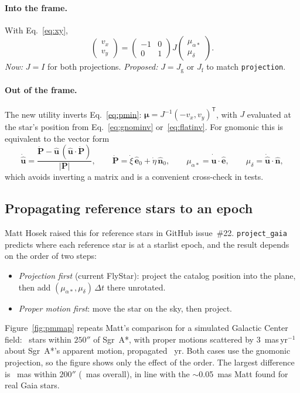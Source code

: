\documentclass[11pt]{article}
\newcommand{\code}[1]{\texttt{#1}}
\newcommand{\uvec}[1]{\hat{\mathbf #1}}
\begin{document}
\paragraph{Into the frame.} With Eq.~\eqref{eq:xy},
\begin{equation}
  \begin{pmatrix} v_x \\ v_y \end{pmatrix}
  = \begin{pmatrix} -1 & 0 \\ 0 & 1 \end{pmatrix} J
    \begin{pmatrix} \mu_{\alpha*} \\ \mu_\delta \end{pmatrix}.
  \label{eq:pmin}
\end{equation}
\emph{Now:} $J = I$ for both projections. \emph{Proposed:} $J = J_\mathrm{g}$
or $J_\mathrm{f}$ to match \code{projection}.

\paragraph{Out of the frame.} The new utility inverts Eq.~\eqref{eq:pmin}:
$\boldsymbol\mu = J^{-1}(-v_x, v_y)^{\mathsf T}$, with $J$ evaluated at the
star's position from Eq.~\eqref{eq:gnominv} or~\eqref{eq:flatinv}. For
gnomonic this is equivalent to the vector form
\begin{equation}
  \dot{\uvec u} = \frac{\dot{\mathbf P} - \uvec u\,(\uvec u\cdot\dot{\mathbf P})}{|\mathbf P|},
  \qquad \dot{\mathbf P} = \dot\xi\,\uvec e_0 + \dot\eta\,\uvec n_0,
  \qquad \mu_{\alpha*} = \dot{\uvec u}\cdot\uvec e, \qquad \mu_\delta = \dot{\uvec u}\cdot\uvec n,
  \label{eq:pmout}
\end{equation}
which avoids inverting a matrix and is a convenient cross-check in tests.

\subsection{Propagating reference stars to an epoch}
\label{sec:order}

Matt Hosek raised this for reference stars in GitHub issue~\#22.
\code{project\_gaia} predicts where each reference star is at a starlist epoch,
and the result depends on the order of two steps:
\begin{itemize}
  \item \emph{Projection first} (current FlyStar): project the catalog position
    into the plane, then add $(\mu_{\alpha*},\mu_\delta)\,\Delta t$ there
    unrotated.
  \item \emph{Proper motion first}: move the star on the sky, then project.
\end{itemize}
Figure~\ref{fig:pmmap} repeats Matt's comparison for a simulated Galactic
Center field: \PMMapN\ stars within $250''$ of Sgr~A*, with proper motions
scattered by 3~mas\,yr$^{-1}$ about Sgr~A*'s apparent motion, propagated
\PMMapDt~yr. Both cases use the gnomonic projection, so the figure shows only
the effect of the order. The largest difference is \PMMapMaxInner~mas within
$200''$ (\PMMapMax~mas overall), in line with the $\sim$0.05~mas Matt found
for real Gaia stars.
\end{document}
